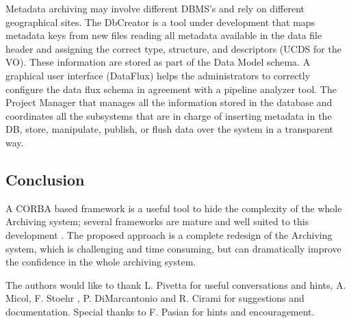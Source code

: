 
Metadata archiving may involve different DBMS's and rely on different geographical sites. The DbCreator is a tool under development that maps metadata keys from new files reading all metadata available in the data file header and assigning the correct type, structure, and descriptors (UCDS for the VO). These information are stored as part of the Data Model schema. A graphical user interface (DataFlux) helps the administrators to correctly configure the data flux schema in agreement with a pipeline analyzer tool. The Project Manager that manages all the information stored in the database and coordinates all the subsystems that are in charge of inserting metadata in the DB, store, manipulate, publish, or flush data over the system in a transparent way.

\subsection{Conclusion}
A CORBA based framework is a useful tool to hide the complexity of the whole Archiving system; several frameworks are mature and well suited to this development . The proposed approach is a complete redesign of the Archiving system, which is challenging and time consuming, but can dramatically improve the confidence in the whole archiving system.

\acknowledgements The authors would like to thank L. Pivetta for useful conversations and hints, A. Micol, F. Stoehr , P. DiMarcantonio and R. Cirami for suggestions and documentation. Special thanks to F. Pasian for hints and encouragement.
